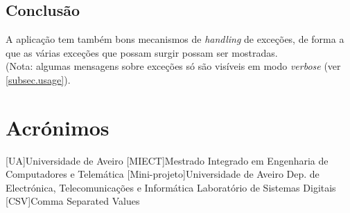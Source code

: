 \documentclass{report}
\begin{document}
\section{Conclusão}
A aplicação tem também bons mecanismos de \textit{handling} de exceções, de forma a que as várias exceções que possam surgir possam ser mostradas.\\
(Nota: algumas mensagens sobre exceções só são visíveis em modo \textit{verbose} (ver \autoref{subsec.usage}).
\chapter*{Acrónimos}
\begin{acronym}
[UA]{Universidade de Aveiro}
[MIECT]{Mestrado Integrado em Engenharia de Computadores e Telemática}
[Mini-projeto]{Universidade de Aveiro
		Dep. de Electrónica, Telecomunicações e Informática
		Laboratório de Sistemas Digitais}
[CSV]{Comma Separated Values}
\end{acronym}



\end{document}
